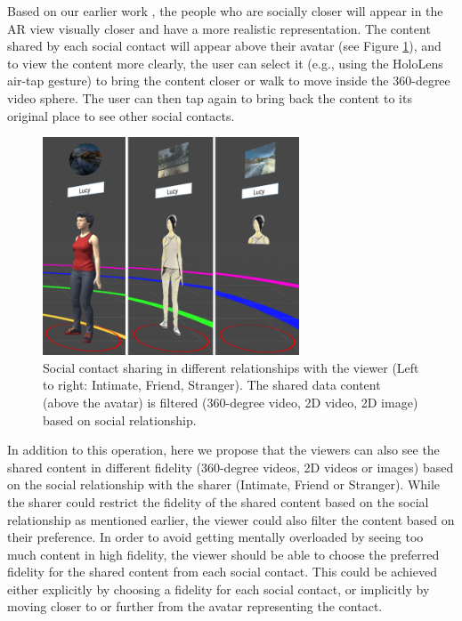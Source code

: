Based on our earlier work \cite{Nassani2017a}, the people who are socially closer will appear in the AR view visually closer and have a more realistic representation. The content shared by each social contact will appear above their avatar (see Figure \ref{fig:data:viewer}), and to view the content more clearly, the user can select it (e.g., using the HoloLens air-tap gesture) to bring the content closer or walk to move inside the 360-degree video sphere. The user can then tap again to bring back the content to its original place to see other social contacts. 

\begin{figure}[ht]
    \centering
    \includegraphics[width=3in]{images/chi/3_levels_of_data.png}
    \caption{Social contact sharing in different relationships with the viewer (Left to right: Intimate, Friend, Stranger). The shared data content (above the avatar) is filtered (360-degree video, 2D video, 2D image) based on social relationship.}
      \label{fig:data:viewer}
\end{figure}

In addition to this operation, here we propose that the viewers can also see the shared content in different fidelity (360-degree videos, 2D videos or images) based on the social relationship with the sharer (Intimate, Friend or Stranger). While the sharer could restrict the fidelity of the shared content based on the social relationship as mentioned earlier, the viewer could also filter the content based on their preference. In order to avoid getting mentally overloaded by seeing too much content in high fidelity, the viewer should be able to choose the preferred fidelity for the shared content from each social contact. This could be achieved either explicitly by choosing a fidelity for each social contact, or implicitly by moving closer to or further from the avatar representing the contact.      

